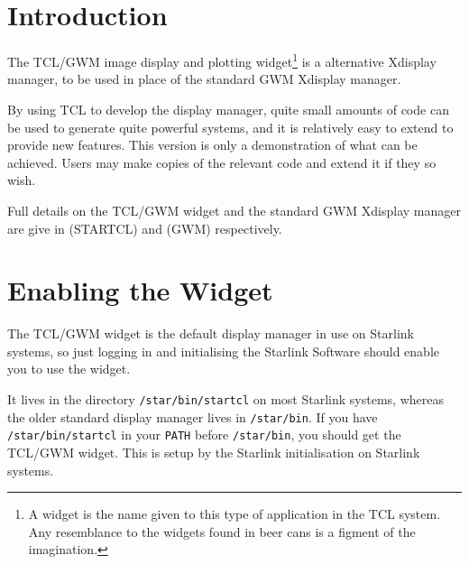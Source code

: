 \stardocabstract
 \newpage
 \begin{latexonly}
   \setlength{\parskip}{0mm}
   \latexonlytoc
   \setlength{\parskip}{\medskipamount}
   \markboth{\stardocname}{\stardocname}
 \end{latexonly}
\cleardoublepage
\renewcommand{\thepage}{\arabic{page}}
\setcounter{page}{1}

\section{\label{introduction}Introduction}

The TCL/GWM image display and plotting widget\footnote{A widget is the
name given to this type of application in the TCL system.  Any resemblance
to the widgets found in beer cans is a figment of the imagination.} is a
alternative Xdisplay manager, to be used in place of the standard
GWM Xdisplay manager.

By using TCL to develop the display manager, quite small amounts of code
can be used to generate quite powerful systems, and it is relatively easy
to extend to provide new features.  This version is only a demonstration of
what can be achieved.  Users may make copies of the relevant code and
extend it if they so wish.

Full details on the TCL/GWM widget and the standard GWM Xdisplay
manager are give in  (STARTCL) and
 (GWM) respectively.

\section{\label{enabling_the_widget}Enabling the Widget}

The TCL/GWM widget is the default display manager in use on Starlink
systems, so just logging in and initialising the Starlink Software should
enable you to use the widget.

It lives in the directory {\tt{/star/bin/startcl}} on most Starlink systems,
whereas the older standard display manager lives in {\tt{/star/bin}}.  If you
have {\tt{/star/bin/startcl}} in your {\tt{PATH}} before {\tt{/star/bin}},
you should get the TCL/GWM widget.  This is setup by the Starlink
initialisation on Starlink systems.

